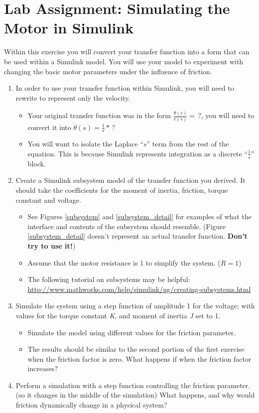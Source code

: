 \documentclass[11pt,fleqn]{book} %
\begin{document}
\section{Lab Assignment: Simulating the Motor in Simulink}
Within this exercise you will convert your transfer function into a form that can be used within a Simulink model. You will use your model to experiment with changing the basic motor parameters under the influence of friction.

\begin{enumerate}
    \item In order to use your transfer function within Simulink, you will need to rewrite to represent only the velocity. 
    \begin{itemize}
        \item Your original transfer function was in the form $\frac{\dot{\theta}(s)}{v(s)} = \,?$, you will need to convert it into $\dot{\theta}(s) = \frac{1}{s}*\,?$
        \item You will want to isolate the Laplace ``$s$'' term from the rest of the equation. This is because Simulink represents integration as a discrete ``$\frac{1}{s}$'' block. 
    \end{itemize}
    \item Create a Simulink subsystem model of the transfer function you derived. It should take the coefficients for the moment of inertia, friction, torque constant and voltage.
    \begin{itemize}
        \item See Figures \ref{subsystem} and \ref{subsystem_detail} for examples of what the interface and contents of the subsystem should resemble. (Figure \ref{subsystem_detail} doesn't represent an actual transfer function. \textbf{Don't try to use it!})
        \item Assume that the motor resistance is 1 to simplify the system. ($R=1$)
        \item The following tutorial on subsystems may be helpful:\\ \href{http://www.mathworks.com/help/simulink/ug/creating-subsystems.html}{http://www.mathworks.com/help/simulink/ug/creating-subsystems.html}
     \end{itemize}
    \item Simulate the system using a step function of amplitude 1 for the voltage; with values for the torque constant \textit{K}, and moment of inertia \textit{J} set to 1. 
    \begin{itemize}
        \item Simulate the model using different values for the friction parameter.
        \item The results should be similar to the second portion of the first exercise when the friction factor is zero. What happens if when the friction factor increases?
    \end{itemize}
    \item Perform a simulation with a step function controlling the friction parameter. (so it changes in the middle of the simulation) What happens, and why would friction dynamically change in a physical system? 
\end{enumerate}
\end{document}
